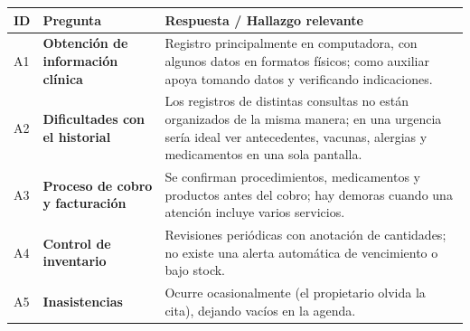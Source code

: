 \documentclass[
]{article}
\newcounter{none} %
\begin{document}
{\def\LTcaptype{none} %
\begin{longtable}[]{|
  >{\centering\arraybackslash}p{}|
  >{\raggedright\arraybackslash}p{}|
  >{\raggedright\arraybackslash}p{}|}
\hline
\begin{minipage}[b]{\linewidth}\centering
\textbf{ID}
\end{minipage} & \begin{minipage}[b]{\linewidth}\centering
\textbf{Pregunta}
\end{minipage} & \begin{minipage}[b]{\linewidth}\raggedright
\textbf{Respuesta / Hallazgo relevante}
\end{minipage} \\
\hline
\endhead
\hline
\endlastfoot
A1 & \textbf{Obtención de información clínica} &
\begin{minipage}[t]{\linewidth}\raggedright
Registro principalmente en computadora, con algunos datos en formatos físicos; como auxiliar apoya tomando datos y verificando indicaciones.
\end{minipage} \\
\hline
A2 & \textbf{Dificultades con el historial} &
\begin{minipage}[t]{\linewidth}\raggedright
Los registros de distintas consultas no están organizados de la misma manera; en una urgencia sería ideal ver antecedentes, vacunas, alergias y medicamentos en una sola pantalla.
\end{minipage} \\
\hline
A3 & \textbf{Proceso de cobro y facturación} &
\begin{minipage}[t]{\linewidth}\raggedright
Se confirman procedimientos, medicamentos y productos antes del cobro; hay demoras cuando una atención incluye varios servicios.
\end{minipage} \\
\hline
A4 & \textbf{Control de inventario} &
\begin{minipage}[t]{\linewidth}\raggedright
Revisiones periódicas con anotación de cantidades; no existe una alerta automática de vencimiento o bajo stock.
\end{minipage} \\
\hline
A5 & \textbf{Inasistencias} &
\begin{minipage}[t]{\linewidth}\raggedright
Ocurre ocasionalmente (el propietario olvida la cita), dejando vacíos en la agenda.

\end{minipage}
\end{longtable}}
\end{document}
